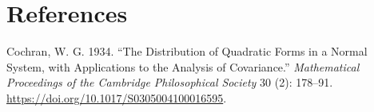 \documentclass[
  letterpaper,
  DIV=11,
  numbers=noendperiod]{scrreprt}
\newlength{\cslhangindent}
\newlength{\cslentryspacingunit} %
\newenvironment{CSLReferences}[2] %
 {%
  \setlength{\parindent}{0pt}
  \ifodd #1
  \let\oldpar\par
  \def\par{\hangindent=\cslhangindent\oldpar}
  \fi
  \setlength{\parskip}{#2\cslentryspacingunit}
 }%
 {}
\theoremstyle{plain}
\theoremstyle{remark}
\begin{document}

\hypertarget{references}{%
\chapter*{References}\label{references}}


\hypertarget{refs}{}
\begin{CSLReferences}{1}{0}
\leavevmode{}%
Cochran, W. G. 1934. {``The Distribution of Quadratic Forms in a Normal
System, with Applications to the Analysis of Covariance.''}
\emph{Mathematical Proceedings of the Cambridge Philosophical Society}
30 (2): 178--91. \url{https://doi.org/10.1017/S0305004100016595}.

\end{CSLReferences}
\end{document}
